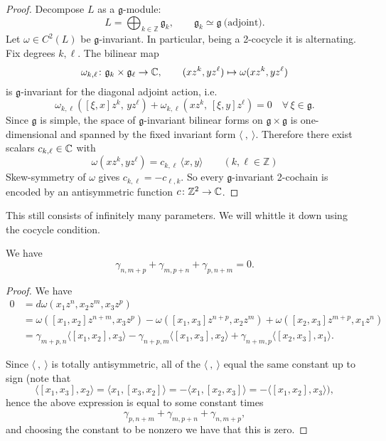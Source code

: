 \documentclass[12pt]{article}
\begin{document}
\begin{proof}
    Decompose $L$ as a $\mathfrak g$-module:
    \[
        L=\bigoplus_{k\in\mathbb Z}\mathfrak g_k,
        \qquad \mathfrak g_k\simeq \mathfrak g \ \text{(adjoint)}.
    \]
    Let $\omega\in C^2(L)$ be $\mathfrak g$-invariant. In particular, being a 2-cocycle it is alternating. Fix degrees $k,\ell$. The bilinear map
    \[
        \omega_{k,\ell}\colon \mathfrak g_k\times \mathfrak g_\ell\to\Bbb C,\qquad
        (x z^k, y z^\ell)\mapsto \omega(x z^k, y z^\ell)
    \]
    is $\mathfrak g$-invariant for the diagonal adjoint action, i.e.
    \[
        \omega_{k,\ell}([\xi,x]z^k,\,y z^\ell)+\omega_{k,\ell}(x z^k,\,[\xi,y]z^\ell)=0
        \quad \forall\,\xi\in\mathfrak g.
    \]
    Since $\mathfrak g$ is simple, the space of $\mathfrak g$-invariant bilinear forms on $\mathfrak g\times\mathfrak g$ is one-dimensional and spanned by the fixed invariant form $\langle\ ,\ \rangle$. Therefore there exist scalars $c_{k,\ell}\in\Bbb C$ with \[\omega(x z^k, y z^\ell)=c_{k,\ell}\,\langle x,y\rangle\qquad(k,\ell\in\mathbb{Z})\] Skew-symmetry of $\omega$ gives $c_{k,\ell}=-c_{\ell,k}$. So every $\mathfrak g$-invariant 2-cochain is encoded by an antisymmetric function
    $c\colon \mathbb Z^2\to\Bbb C$.
\end{proof}

This still consists of infinitely many parameters. We will whittle it down using the cocycle condition.

\begin{proposition}
    We have
    \[
        \gamma_{n,m+p} + \gamma_{m,p+n} + \gamma_{p,n+m} = 0.
    \]
\end{proposition}

\begin{proof}
    We have
    \begin{align*}
        0 & = d\omega(x_1 z^n, x_2 z^m, x_3 z^p)            \\
          & = \omega([x_1,x_2]z^{n+m}, x_3 z^p)
        - \omega([x_1,x_3] z^{n+p}, x_2 z^m)
        + \omega([x_2,x_3] z^{m+p}, x_1 z^n)                \\
          & = \gamma_{m+p,n} \langle [x_1,x_2], x_3 \rangle
        - \gamma_{n+p,m} \langle [x_1,x_3], x_2 \rangle
        + \gamma_{n+m,p} \langle [x_2,x_3], x_1 \rangle.
    \end{align*}

    Since $\langle \ ,\ \rangle$ is totally antisymmetric, all of the $\langle \ ,\ \rangle$ equal the same constant up to sign (note that
    \[
        \langle [x_1,x_3], x_2\rangle = \langle x_1, [x_3,x_2]\rangle
        = -\langle x_1, [x_2,x_3]\rangle
        = -\langle [x_1,x_2], x_3\rangle),
    \]
    hence the above expression is equal to some constant times
    \[
        \gamma_{p,n+m} + \gamma_{m,p+n} + \gamma_{n,m+p},
    \]
    and choosing the constant to be nonzero we have that this is zero.
\end{proof}
\end{document}
